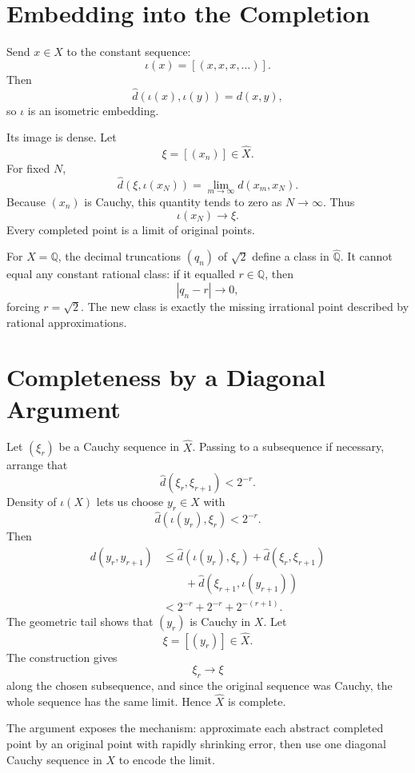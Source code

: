 \section{Embedding into the Completion}

Send \(x\in X\) to the constant sequence:
\[
  \iota(x)=[(x,x,x,\ldots)].
\]
Then
\[
  \widehat d(\iota(x),\iota(y))=d(x,y),
\]
so \(\iota\) is an isometric embedding.

Its image is dense.  Let
\[
  \xi=[(x_n)]\in\widehat X.
\]
For fixed \(N\),
\[
  \widehat d(\xi,\iota(x_N))
  =\lim_{m\to\infty}d(x_m,x_N).
\]
Because \((x_n)\) is Cauchy, this quantity tends to zero as \(N\to\infty\).  Thus
\[
  \iota(x_N)\longrightarrow\xi.
\]
Every completed point is a limit of original points.

For \(X=\mathbb Q\), the decimal truncations \((q_n)\) of \(\sqrt2\) define a class in \(\widehat{\mathbb Q}\).  It cannot equal any constant rational class: if it equalled \(r\in\mathbb Q\), then
\[
  |q_n-r|\longrightarrow0,
\]
forcing \(r=\sqrt2\).  The new class is exactly the missing irrational point described by rational approximations.

\section{Completeness by a Diagonal Argument}

Let \((\xi_r)\) be a Cauchy sequence in \(\widehat X\).  Passing to a subsequence if necessary, arrange that
\[
  \widehat d(\xi_r,\xi_{r+1})<2^{-r}.
\]
Density of \(\iota(X)\) lets us choose \(y_r\in X\) with
\[
  \widehat d(\iota(y_r),\xi_r)<2^{-r}.
\]
Then
\[
\begin{aligned}
  d(y_r,y_{r+1})
  &\le
  \widehat d(\iota(y_r),\xi_r)
  +\widehat d(\xi_r,\xi_{r+1})\\
  &\qquad
  +\widehat d(\xi_{r+1},\iota(y_{r+1}))\\
  &<2^{-r}+2^{-r}+2^{-(r+1)}.
\end{aligned}
\]
The geometric tail shows that \((y_r)\) is Cauchy in \(X\).  Let
\[
  \xi=[(y_r)]\in\widehat X.
\]
The construction gives
\[
  \xi_r\longrightarrow\xi
\]
along the chosen subsequence, and since the original sequence was Cauchy, the whole sequence has the same limit.  Hence \(\widehat X\) is complete.

The argument exposes the mechanism: approximate each abstract completed point by an original point with rapidly shrinking error, then use one diagonal Cauchy sequence in \(X\) to encode the limit.

